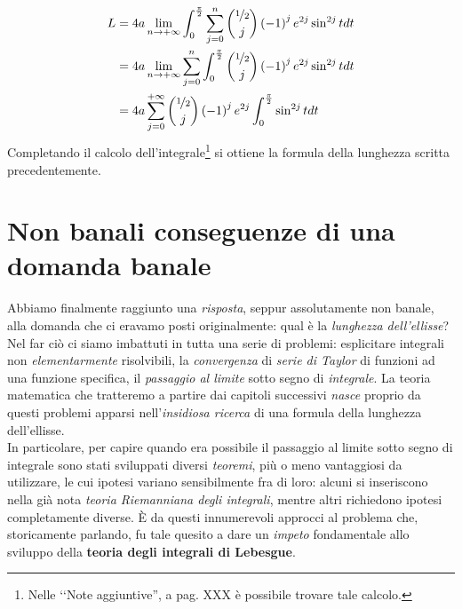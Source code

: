 \begin{align*}
	L&=4a\lim_{n\to+\infty}\int_{0}^{\frac{\pi}{2}}\sum_{j=0}^{n}\binom{\nicefrac{1}{2}}{j}\left(-1\right)^je^{2j}\sin^{2j}tdt\\
	&=4a\lim_{n\to+\infty}\sum_{j=0}^{n}\int_{0}^{\frac{\pi}{2}}\binom{\nicefrac{1}{2}}{j}\left(-1\right)^je^{2j}\sin^{2j}tdt\\
	&=4a\sum_{j=0}^{+\infty}\binom{\nicefrac{1}{2}}{j}\left(-1\right)^je^{2j}\int_{0}^{\frac{\pi}{2}}\sin^{2j}tdt
\end{align*}
Completando il calcolo dell'integrale\footnote{Nelle ‘‘Note aggiuntive'', a pag. XXX è possibile trovare tale calcolo.} si ottiene la formula della lunghezza scritta precedentemente.\\
\section{Non banali conseguenze di una domanda banale}
Abbiamo finalmente raggiunto una \textit{risposta}, seppur assolutamente non banale, alla domanda che ci eravamo posti originalmente: qual è la \textit{lunghezza dell'ellisse}? Nel far ciò ci siamo imbattuti in tutta una serie di problemi: esplicitare integrali non \textit{elementarmente} risolvibili, la \textit{convergenza} di \textit{serie di Taylor} di funzioni ad una funzione specifica, il \textit{passaggio al limite} sotto segno di \textit{integrale}.
La teoria matematica che tratteremo a partire dai capitoli successivi \textit{nasce} proprio da questi problemi apparsi nell'\textit{insidiosa ricerca} di una formula della lunghezza dell'ellisse.\\
In particolare, per capire quando era possibile il passaggio al limite sotto segno di integrale sono stati sviluppati diversi \textit{teoremi}, più o meno vantaggiosi da utilizzare, le cui ipotesi variano sensibilmente fra di loro: alcuni si inseriscono nella già nota \textit{teoria Riemanniana degli integrali}, mentre altri richiedono ipotesi completamente diverse. È da questi innumerevoli approcci al problema che, storicamente parlando, fu tale quesito a dare un \textit{impeto} fondamentale allo sviluppo della \textbf{teoria degli integrali di Lebesgue}.